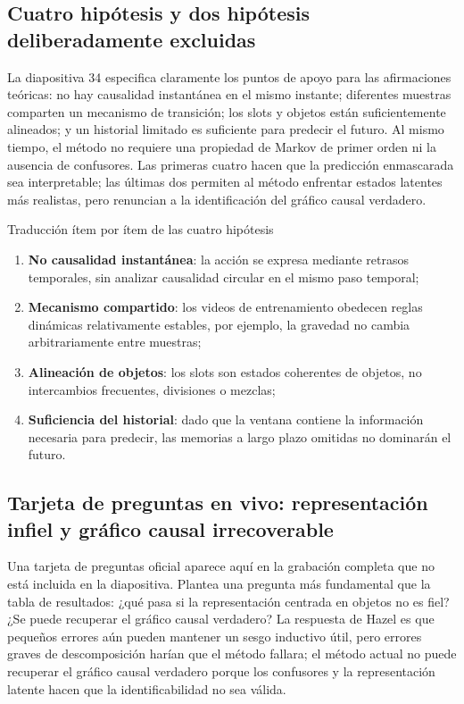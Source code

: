 \subsection{Cuatro hipótesis y dos hipótesis deliberadamente excluidas}

La diapositiva 34 especifica claramente los puntos de apoyo para las afirmaciones teóricas: no hay causalidad instantánea en el mismo instante; diferentes muestras comparten un mecanismo de transición; los slots y objetos están suficientemente alineados; y un historial limitado es suficiente para predecir el futuro. Al mismo tiempo, el método no requiere una propiedad de Markov de primer orden ni la ausencia de confusores. Las primeras cuatro hacen que la predicción enmascarada sea interpretable; las últimas dos permiten al método enfrentar estados latentes más realistas, pero renuncian a la identificación del gráfico causal verdadero.


\begin{knowledgebox}{Traducción ítem por ítem de las cuatro hipótesis}
\begin{enumerate}
  \item \textbf{No causalidad instantánea}: la acción se expresa mediante retrasos temporales, sin analizar causalidad circular en el mismo paso temporal;
  \item \textbf{Mecanismo compartido}: los videos de entrenamiento obedecen reglas dinámicas relativamente estables, por ejemplo, la gravedad no cambia arbitrariamente entre muestras;
  \item \textbf{Alineación de objetos}: los slots son estados coherentes de objetos, no intercambios frecuentes, divisiones o mezclas;
  \item \textbf{Suficiencia del historial}: dado que la ventana contiene la información necesaria para predecir, las memorias a largo plazo omitidas no dominarán el futuro.
\end{enumerate}
\end{knowledgebox}

\subsection{Tarjeta de preguntas en vivo: representación infiel y gráfico causal irrecoverable}

Una tarjeta de preguntas oficial aparece aquí en la grabación completa que no está incluida en la diapositiva. Plantea una pregunta más fundamental que la tabla de resultados: ¿qué pasa si la representación centrada en objetos no es fiel? ¿Se puede recuperar el gráfico causal verdadero? La respuesta de Hazel es que pequeños errores aún pueden mantener un sesgo inductivo útil, pero errores graves de descomposición harían que el método fallara; el método actual no puede recuperar el gráfico causal verdadero porque los confusores y la representación latente hacen que la identificabilidad no sea válida.

